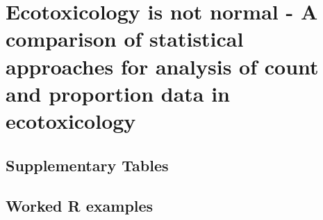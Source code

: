 \chapter[Ecotoxicology is not normal]{Ecotoxicology is not normal - A comparison of statistical approaches for analysis of count and proportion data in ecotoxicology}
\label{ap:usetheglm}  

\section{Supplementary Tables}
\label{ap:usetheglm:tables}  











\FloatBarrier

\section{Worked R examples}
\label{ap:usetheglm:examples}  

